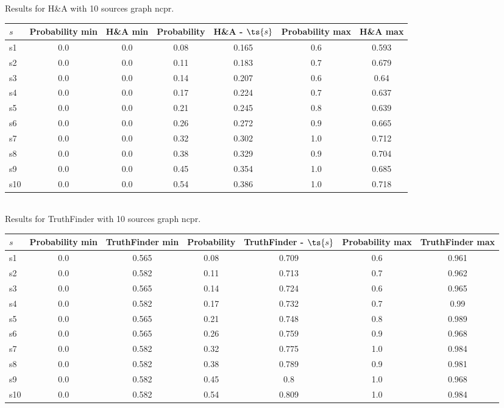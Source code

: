 \documentclass{article}
\begin{document}
\noindent Results for H\&A with 10 sources graph ncpr.

\noindent\begin{tabular}{|l|c|c|c|c|c|c|}
\hline
$s$& Probability min & H\&A min & Probability & H\&A - $\ts{s}$ & Probability max & H\&A max\\
\hline
s1 &0.0 & 0.0 & 0.08 & 0.165 & 0.6 & 0.593\\
\hline
s2 &0.0 & 0.0 & 0.11 & 0.183 & 0.7 & 0.679\\
\hline
s3 &0.0 & 0.0 & 0.14 & 0.207 & 0.6 & 0.64\\
\hline
s4 &0.0 & 0.0 & 0.17 & 0.224 & 0.7 & 0.637\\
\hline
s5 &0.0 & 0.0 & 0.21 & 0.245 & 0.8 & 0.639\\
\hline
s6 &0.0 & 0.0 & 0.26 & 0.272 & 0.9 & 0.665\\
\hline
s7 &0.0 & 0.0 & 0.32 & 0.302 & 1.0 & 0.712\\
\hline
s8 &0.0 & 0.0 & 0.38 & 0.329 & 0.9 & 0.704\\
\hline
s9 &0.0 & 0.0 & 0.45 & 0.354 & 1.0 & 0.685\\
\hline
s10 &0.0 & 0.0 & 0.54 & 0.386 & 1.0 & 0.718\\
\hline
\end{tabular}\\

\noindent Results for TruthFinder with 10 sources graph ncpr.

\noindent\begin{tabular}{|l|c|c|c|c|c|c|}
\hline
$s$& Probability min & TruthFinder min & Probability & TruthFinder - $\ts{s}$ & Probability max & TruthFinder max\\
\hline
s1 &0.0 & 0.565 & 0.08 & 0.709 & 0.6 & 0.961\\
\hline
s2 &0.0 & 0.582 & 0.11 & 0.713 & 0.7 & 0.962\\
\hline
s3 &0.0 & 0.565 & 0.14 & 0.724 & 0.6 & 0.965\\
\hline
s4 &0.0 & 0.582 & 0.17 & 0.732 & 0.7 & 0.99\\
\hline
s5 &0.0 & 0.565 & 0.21 & 0.748 & 0.8 & 0.989\\
\hline
s6 &0.0 & 0.565 & 0.26 & 0.759 & 0.9 & 0.968\\
\hline
s7 &0.0 & 0.582 & 0.32 & 0.775 & 1.0 & 0.984\\
\hline
s8 &0.0 & 0.582 & 0.38 & 0.789 & 0.9 & 0.981\\
\hline
s9 &0.0 & 0.582 & 0.45 & 0.8 & 1.0 & 0.968\\
\hline
s10 &0.0 & 0.582 & 0.54 & 0.809 & 1.0 & 0.984\\
\hline
\end{tabular}\\
\end{document}
